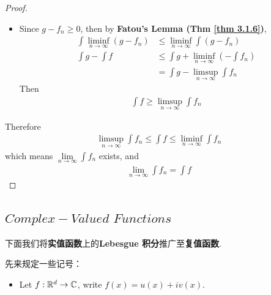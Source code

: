 \begin{thm}
\begin{proof}
\begin{itemize}
 				\item Since $g - f_n \geq 0$, then by \textbf{Fatou's Lemma (Thm \ref{thm 3.1.6})},
 				\begin{align}
 					\int{\liminf_{n \to \infty}{(g - f_n)}} &\leq \liminf_{n \to \infty}{\int{(g - f_n)}} \\
 					\int{g} - \int{f} &\leq \int{g} + \liminf_{n \to \infty}{(-\int{f_n})} \\
 					&= \int{g} - \limsup_{n \to \infty}{\int{f_n}}
 				\end{align}
 				Then
 				\begin{align}
 					\int{f} \geq \limsup_{n \to \infty}{\int{f_n}}
 				\end{align}
 			\end{itemize}
 			Therefore
 			\begin{align}
 				\limsup_{n \to \infty}{\int{f_n}} \leq \int{f} \leq \liminf_{n \to \infty}{\int{f_n}}
 			\end{align}
 			which means $\underset{n \to \infty}{\lim}{\int{f_n}}$ exists, and
 			\begin{align}
 				\lim_{n \to \infty}{\int{f_n}} = \int{f}
 			\end{align}
 		\end{proof}
 	\end{thm}
 
 \newpage
 \subsection{$Complex-Valued \,\, Functions$}
 \begin{center}
 	下面我们将\textbf{实值函数}上的\textbf{Lebesgue 积分}推广至\textbf{复值函数}.
 \end{center}
 	
 	先来规定一些记号：
 	\begin{itemize}
 		\item Let $f : \mathbb{R}^d \rightarrow \mathbb{C}$, write $f(x) = u(x) + i v(x)$.
 	\end{itemize}
 	

